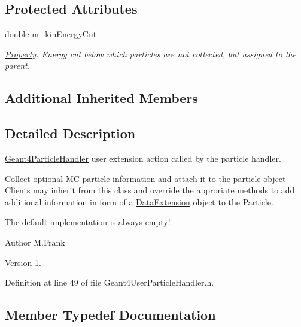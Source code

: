 \subsection*{Protected Attributes}
\begin{DoxyCompactItemize}
\item 
double \hyperlink{class_d_d4hep_1_1_simulation_1_1_geant4_user_particle_handler_aaa82abebed535571499c3fa436f86a1b}{m\+\_\+kin\+Energy\+Cut}
\begin{DoxyCompactList}\small\item\em \hyperlink{class_d_d4hep_1_1_property}{Property}\+: Energy cut below which particles are not collected, but assigned to the parent. \end{DoxyCompactList}\end{DoxyCompactItemize}
\subsection*{Additional Inherited Members}


\subsection{Detailed Description}
\hyperlink{class_d_d4hep_1_1_simulation_1_1_geant4_particle_handler}{Geant4\+Particle\+Handler} user extension action called by the particle handler. 

Collect optional MC particle information and attach it to the particle object Clients may inherit from this class and override the approriate methods to add additional information in form of a \hyperlink{class_d_d4hep_1_1_simulation_1_1_data_extension}{Data\+Extension} object to the Particle.

The default implementation is always empty!

\begin{DoxyAuthor}{Author}
M.\+Frank 
\end{DoxyAuthor}
\begin{DoxyVersion}{Version}
1. 
\end{DoxyVersion}


Definition at line 49 of file Geant4\+User\+Particle\+Handler.\+h.



\subsection{Member Typedef Documentation}
\hypertarget{class_d_d4hep_1_1_simulation_1_1_geant4_user_particle_handler_a0222f326d539ff27c6c446a7a30e8e26}{}\label{class_d_d4hep_1_1_simulation_1_1_geant4_user_particle_handler_a0222f326d539ff27c6c446a7a30e8e26} 
